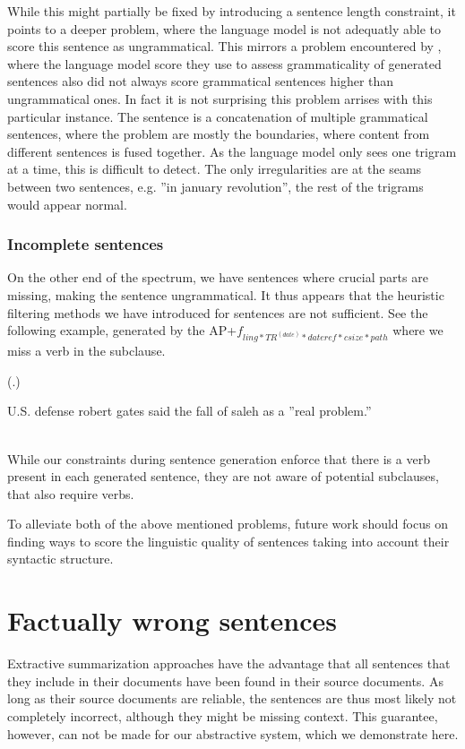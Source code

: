 \documentclass[a4paper,BCOR=10mm]{report}
\newcounter{quotecount}[chapter]
\newcommand{\countquotenosource}[1]{\vspace{1cm}\refstepcounter{quotecount}%
     (\thechapter.\arabic{quotecount}) \hspace*{1cm} \parbox{9cm}{#1}\\[1cm]}
\numberwithin{lemma}{chapter}
\numberwithin{definition}{chapter}
\begin{document}
While this might partially be fixed by introducing a sentence length constraint, it points to a deeper problem, where the language model is not adequatly able to score this sentence as ungrammatical.
This mirrors a problem encountered by \citet{mckeown}, where the language model score they use to assess grammaticality of generated sentences also did not always score grammatical sentences higher than ungrammatical ones. In fact it is not surprising this problem arrises with this particular instance. The sentence is a concatenation of multiple grammatical sentences, where the problem are mostly the boundaries, where content from different sentences is fused together. As the language model only sees one trigram at a time, this is difficult to detect. The only irregularities are at the seams between two sentences, e.g. ''in january revolution'', the rest of the trigrams would appear normal.

\subsubsection{Incomplete sentences}

On the other end of the spectrum, we have sentences where crucial parts are missing, making the sentence ungrammatical. It thus appears that the heuristic filtering methods we have introduced for sentences are not sufficient.
See the following example, generated by the AP+$f_{ ling*TR^{(date)}*\mathit{dateref}*\mathit{csize}*\mathit{path} }$ where we miss a verb in the subclause.

\countquotenosource{
    U.S. defense robert gates said the fall of saleh as a ''real problem.''
}

While our constraints during sentence generation enforce that there is a verb present in each generated sentence, they are not aware of potential subclauses, that also require verbs.

To alleviate both of the above mentioned problems, future work should focus on finding ways to score the linguistic quality of sentences taking into account their syntactic structure.

\section{Factually wrong sentences}

Extractive summarization approaches have the advantage that all sentences that they include in their documents have been found in their source documents. As long as their source documents are reliable, the sentences are thus most likely not completely incorrect, although they might be missing context.
This guarantee, however, can not be made for our abstractive system, which we demonstrate here.
\end{document}
